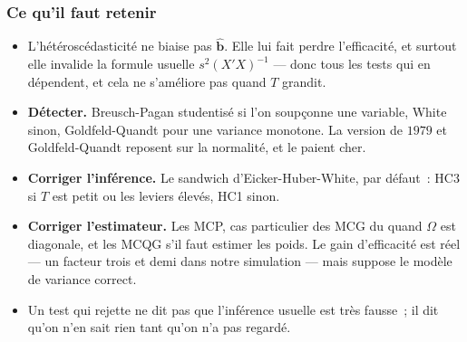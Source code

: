 \documentclass[10pt]{beamer}
\begin{document}
\begin{frame}
  \frametitle{Ce qu'il faut retenir}

  \begin{itemize}

  \item L'hétéroscédasticité ne biaise pas $\hat{\mathbf b}$. Elle lui fait
    perdre l'efficacité, et surtout elle invalide la formule usuelle
    $s^2(X'X)^{-1}$ — donc tous les tests qui en dépendent, et cela ne
    s'améliore pas quand $T$ grandit.\newline

  \item \textbf{Détecter.} Breusch-Pagan studentisé si l'on soupçonne une
    variable, White sinon, Goldfeld-Quandt pour une variance
    monotone. La version
    de $1979$ et Goldfeld-Quandt reposent sur la normalité, et le paient
    cher.\newline

  \item \textbf{Corriger l'inférence.} Le sandwich d'Eicker-Huber-White, par
    défaut~: HC3 si $T$ est petit ou les leviers élevés, HC1 sinon.\newline

  \item \textbf{Corriger l'estimateur.} Les MCP, cas particulier des MCG du
     quand $\Omega$ est diagonale, et les MCQG s'il faut estimer
    les poids. Le gain d'efficacité est réel — un facteur trois et demi dans
    notre simulation — mais suppose le modèle de variance correct.\newline

  \item[$\Rightarrow$] Un test qui rejette ne dit pas que l'inférence usuelle
    est très fausse~; il dit qu'on n'en sait rien tant qu'on n'a pas regardé.

  \end{itemize}

\end{frame}
\end{document}
